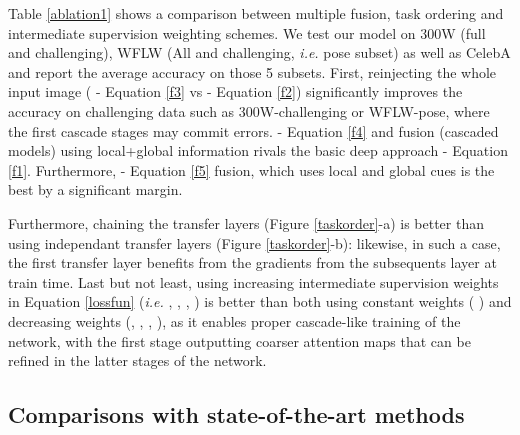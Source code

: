 \documentclass[10pt,twocolumn,letterpaper]{article}
\begin{document}
Table \ref{ablation1} shows a comparison between multiple fusion, task ordering and intermediate supervision weighting schemes. We test our model on 300W (full and challenging), WFLW (All and challenging, \textit{i.e.} pose subset) as well as CelebA and report the average accuracy on those 5 subsets. First, reinjecting the whole input image ( - Equation \eqref{f3} vs  - Equation \eqref{f2}) significantly improves the accuracy on challenging data such as 300W-challenging or WFLW-pose, where the first cascade stages may commit errors.  - Equation \eqref{f4} and  fusion (cascaded models) using local+global information rivals the basic deep approach  - Equation \eqref{f1}. Furthermore,  - Equation \eqref{f5} fusion, which uses local and global cues is the best by a significant margin.

Furthermore, chaining the transfer layers (Figure \ref{taskorder}-a) is better than using independant transfer layers (Figure \ref{taskorder}-b): likewise, in such a case, the first transfer layer benefits from the gradients from the subsequents layer at train time. Last but not least, using increasing intermediate supervision weights in Equation \eqref{lossfun} (\textit{i.e.} , , , ) is better than both using constant weights ( ) and decreasing weights (, , , ), as it enables proper cascade-like training of the network, with the first stage outputting coarser attention maps that can be refined in the latter stages of the network.

\subsection{Comparisons with state-of-the-art methods}
\end{document}
